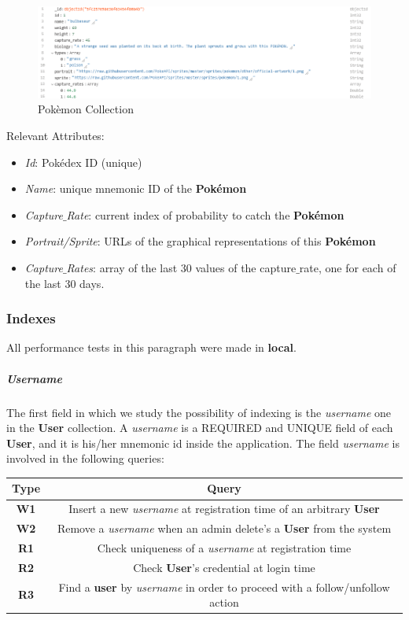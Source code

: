\begin{figure}[H]
	\centering
	\includegraphics[width=\textwidth]{img/pokemon_collection.png}
	\caption{Pokèmon Collection}
\end{figure}
Relevant Attributes:
\begin{itemize}
	\item \textit{Id}: Pokédex ID (unique)
	\item \textit{Name}: unique mnemonic ID of the \textbf{Pokémon}
	\item \textit{Capture$\_$Rate}: current index of probability to catch the \textbf{Pokémon}
	\item \textit{Portrait/Sprite}: URLs of the graphical representations of this \textbf{Pokémon}
	\item \textit{Capture$\_$Rates}: array of the last 30 values of the capture$\_$rate, one for each of the last 30 days.
\end{itemize}

\subsubsection{Indexes}
All performance tests in this paragraph were made in \textbf{local}.
\subparagraph{Username}
The first field in which we study the possibility of indexing is the \textit{username} one in the \textbf{User} collection. A \textit{username} is a REQUIRED and UNIQUE field of each \textbf{User}, and it is his/her mnemonic id inside the application.
The field \textit{username} is involved in the following queries:
\begin{center}
	\begin{tabular}{|c | c |} 
		\hline
		\textbf{Type} & \textbf{Query} \\ [0.5ex] 
		\hline
		\textbf{W1} & Insert a new \textit{username} at registration time of an arbitrary \textbf{User} \\ 
		\hline
		\textbf{W2} & Remove a \textit{username} when an admin delete’s a \textbf{User} from the system \\
		\hline
		\textbf{R1} & Check uniqueness of a \textit{username} at registration time \\
		\hline
		\textbf{R2} & Check \textbf{User}’s credential at login time \\
		\hline
		\textbf{R3} & Find a \textbf{user} by \textit{username} in order to proceed with a follow/unfollow action \\
		\hline
	\end{tabular}
\end{center}

